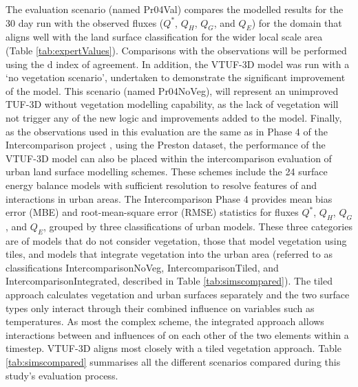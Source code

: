 \documentclass[final,3p,times,authoryear]{elsarticle}
\begin{document}
The evaluation scenario (named Pr04Val) compares the modelled results for the 30 day run with the observed fluxes ($Q^{*}$, $Q_{H}$, $Q_{G}$, and $Q_{E}$) for the domain that aligns well with the land surface classification for the wider local scale area (Table \ref{tab:expertValues}). Comparisons with the observations will be performed using the \cite{Willmott1981} d index of agreement. In addition, the VTUF-3D model was run with a `no vegetation scenario', undertaken to demonstrate the significant improvement of the model. This scenario (named Pr04NoVeg), will represent an unimproved TUF-3D without vegetation modelling capability, as the lack of vegetation will not trigger any of the new logic and improvements added to the model. Finally, as the observations used in this evaluation are the same as in Phase 4 of the Intercomparison project \citep{Best2012}, using the \cite{Coutts2007} Preston dataset, the performance of the VTUF-3D model can also be placed within the intercomparison evaluation of urban land surface modelling schemes. These schemes include the 24 surface energy balance models with sufficient resolution to resolve features of and interactions in urban areas. The Intercomparison Phase 4 provides mean bias error (MBE) and root-mean-square error (RMSE) statistics for fluxes $Q^{*}$, $Q_{H}$, $Q_{G}$, and $Q_{E}$, grouped by three classifications of urban models. These three categories are of models that do not consider vegetation, those that model vegetation using tiles, and models that integrate vegetation into the urban area (referred to as classifications IntercomparisonNoVeg, IntercomparisonTiled, and IntercomparisonIntegrated, described in Table \ref{tab:simscompared}). The tiled approach calculates vegetation and urban surfaces separately and the two surface types only interact through their combined influence on variables such as temperatures. As most the complex scheme, the integrated approach allows interactions between and influences of on each other of the two elements within a timestep. VTUF-3D aligns most closely with a tiled vegetation approach. Table \ref{tab:simscompared} summarises all the different scenarios compared during this study's evaluation process.
\end{document}
